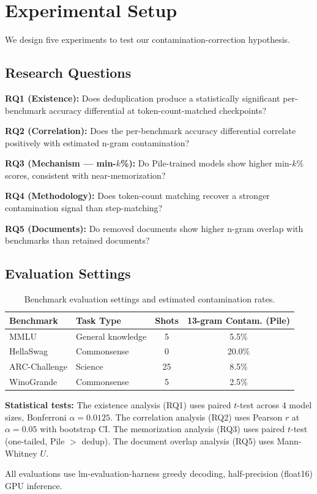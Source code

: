 \section{Experimental Setup}
\label{sec:experiments}

We design five experiments to test our contamination-correction hypothesis.

\subsection{Research Questions}

\textbf{RQ1 (Existence):} Does deduplication produce a statistically significant per-benchmark
accuracy differential at token-count-matched checkpoints?

\textbf{RQ2 (Correlation):} Does the per-benchmark accuracy differential correlate positively
with estimated n-gram contamination?

\textbf{RQ3 (Mechanism --- min-$k$\%):} Do Pile-trained models show higher min-$k$\% scores,
consistent with near-memorization?

\textbf{RQ4 (Methodology):} Does token-count matching recover a stronger contamination signal
than step-matching?

\textbf{RQ5 (Documents):} Do removed documents show higher n-gram overlap with benchmarks
than retained documents?

\subsection{Evaluation Settings}

\begin{table}[h]
\centering
\caption{Benchmark evaluation settings and estimated contamination rates.}
\label{tab:eval_settings}
\begin{tabular}{llcc}
\toprule
Benchmark & Task Type & Shots & 13-gram Contam. (Pile) \\
\midrule
MMLU & General knowledge & 5 & 5.5\% \\
HellaSwag & Commonsense & 0 & 20.0\% \\
ARC-Challenge & Science & 25 & 8.5\% \\
WinoGrande & Commonsense & 5 & 2.5\% \\
\bottomrule
\end{tabular}
\end{table}

\textbf{Statistical tests:} The existence analysis (RQ1) uses paired $t$-test across 4 model sizes, Bonferroni
$\alpha = 0.0125$. The correlation analysis (RQ2) uses Pearson $r$ at $\alpha = 0.05$ with bootstrap CI.
The memorization analysis (RQ3) uses paired $t$-test (one-tailed, Pile $>$ dedup). The document overlap analysis (RQ5) uses Mann-Whitney $U$.

All evaluations use lm-evaluation-harness greedy decoding, half-precision (float16) GPU inference.
